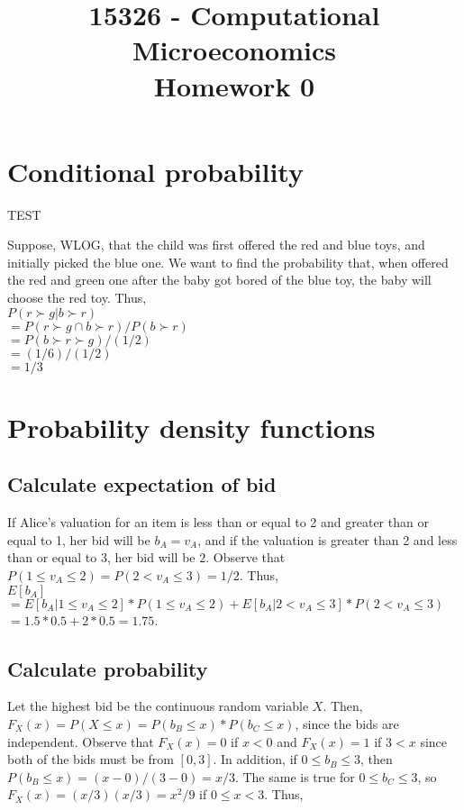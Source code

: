 \documentclass{article}
\title{15326 - Computational Microeconomics\\
Homework 0}
\begin{document}
\maketitle

\section{Conditional probability}

TEST

Suppose, WLOG, that the child was first offered the red and blue toys, and initially picked the blue one. We want to find the probability that, when offered the red and green one after the baby got bored of the blue toy, the baby will choose the red toy. Thus, \\
$P(r \succ g | b \succ r) $\\
$= P(r \succ g \cap b \succ r)/P(b \succ r)$\\
$= P(b \succ r \succ g) / (1/2) $\\
$= (1/6) / (1/2) $\\
$= 1/3 $\\


\section{Probability density functions}


\subsection{Calculate expectation of bid}

If Alice's valuation for an item is less than or equal to 2 and greater than or equal to 1, her bid will be $b_A = v_A$, and if the valuation is greater than 2 and less than or equal to 3, her bid will be $2$. Observe that $P(1 \leq v_A \leq 2) = P(2 < v_A \leq 3) = 1/2$. Thus,\\
$E[b_A]$\\
$ = E[b_A | 1 \leq v_A \leq 2] * P(1 \leq v_A \leq 2) + E[b_A | 2 < v_A \leq 3] * P(2 < v_A \leq 3)$\\
$ = 1.5*0.5 + 2*0.5 = 1.75$. 

\subsection{Calculate probability}

Let the highest bid be the continuous random variable $X$. Then, $F_X(x)=P(X\leq x) = P(b_B \leq x) * P(b_C \leq x)$, since  the bids are independent. Observe that $F_X(x)=0$ if $x<0$ and  $F_X(x)=1$ if $3 < x$ since both of the bids must be from $[0,3]$. In addition, if $0 \leq b_B \leq 3$, then $P(b_B \leq x)=(x-0)/(3-0) = x/3$. The same is true for $0 \leq b_C \leq 3$, so $F_X(x)=(x/3)(x/3) = x^2/9$ if $ 0 \leq x < 3$. Thus, 
\end{document}
